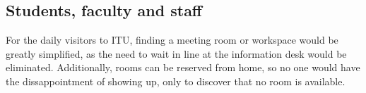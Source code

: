 \subsection{Students, faculty and staff}
For the daily visitors to ITU, finding a meeting room or workspace would be greatly simplified, as the need to wait in line at the information desk would be eliminated. Additionally, rooms can be reserved from home, so no one would have the dissappointment of showing up, only to discover that no room is available.
